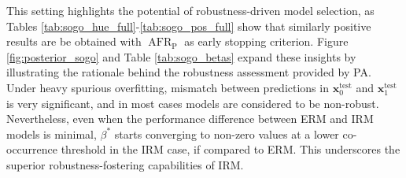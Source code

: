 This setting highlights the potential of robustness-driven model selection, as Tables \ref{tab:sogo_hue_full}-\ref{tab:sogo_pos_full}
show that similarly positive results are be obtained with $\operatorname{AFR}_{\text{P}}$ as early stopping criterion. 
Figure \ref{fig:posterior_sogo} and Table \ref{tab:sogo_betas} expand these insights by illustrating
the rationale behind the robustness assessment provided by PA. Under heavy spurious overfitting, mismatch 
between predictions in $\bm{x}_0^{\text{test}}$ and $\bm{x}_1^{\text{test}}$ is very significant, and in most 
cases models are considered to be non-robust. Nevertheless, even when the performance difference between ERM and IRM models 
is minimal, $\beta^{*}$ starts converging to non-zero values at a lower co-occurrence threshold in the
IRM case, if compared to ERM. This underscores the superior robustness-fostering capabilities of IRM.

